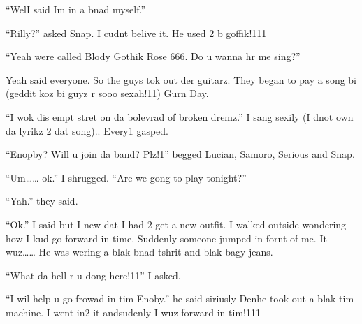 \enquote{Wel\dotfill I said Im in a bnad myself.}

\enquote{Rilly?} asked Snap. I cudnt belive it. He used 2 b goffik!111

\enquote{Yeah were called Blody Gothik Rose 666. Do u wanna hr me sing?}

Yeah said everyone. So the guys tok out der guitarz. They began to pay a song bi (geddit koz bi guyz r sooo sexah!11) Gurn Day.

\enquote{I wok dis empt stret on da bolevrad of broken dremz.} I sang sexily (I dnot own da lyrikz 2 dat song).. Every1 gasped.

\enquote{Enopby? Will u join da band? Plz!1} begged Lucian, Samoro, Serious and Snap.

\enquote{Um\ldots{}\ldots{} ok.} I shrugged. \enquote{Are we gong to play tonight?}

\enquote{Yah.} they said.

\enquote{Ok.} I said but I new dat I had 2 get a new outfit. I walked outside wondering how I kud go forward in time. Suddenly someone jumped in fornt of me. It wuz\ldots{}\ldots{}  He was wering a blak bnad tshrit and blak bagy jeans.

\enquote{What da hell r u dong here!11} I asked.

\enquote{I wil help u go frowad in tim Enoby.} he said siriusly Den\dotfill\newline he took out a blak tim machine. I went in2 it and\dotfill\newline sudenly I wuz forward in tim!111

